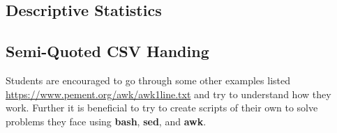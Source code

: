 \subsection{Descriptive Statistics}

\subsection{Semi-Quoted CSV Handing}

Students are encouraged to go through some other examples listed
\href{here}{https://www.pement.org/awk/awk1line.txt} and try to understand how they work. Further it is beneficial to try to create scripts of their own to solve problems they face using \textbf{bash}, \textbf{sed}, and \textbf{awk}.
